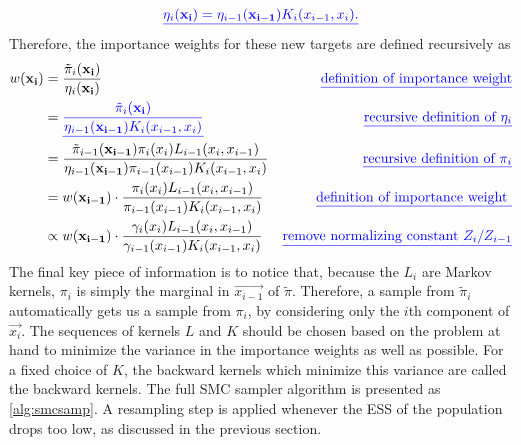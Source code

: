 \[
  \color{blue}\underline{\eta_i(\mathbf{x_i}) = \eta_{i-1}(\mathbf{x_{i-1}})K_i(x_{i-1}, x_i).} \color{black}
\]
Therefore, the importance weights for these new targets are defined recursively as
\begin{align}
  w(\mathbf{x_i}) 
    &= \frac{\tilde{\pi}_i(\mathbf{x_i})}{\eta_i(\mathbf{x_i})} 
      & \color{blue}\underline{\text{definition of importance weight}} \color{black} \nonumber \\
    &= \color{blue}\underline{\frac{\tilde{\pi}_i(\mathbf{x_i})}{\eta_{i-1}(\mathbf{x_{i-1}})K_i(x_{i-1}, x_i)}} \color{black}
      & \color{blue}\underline{\text{recursive definition of } \eta_i} \color{black} \nonumber \\
    &= \frac{\tilde{\pi}_{i-1}(\mathbf{x_{i-1}}) \pi_i(x_i) L_{i-1}(x_i, x_{i-1})}
            {\eta_{i-1}(\mathbf{x_{i-1}}) \pi_{i-1}(x_{i-1}) K_i(x_{i-1}, x_i)}
      & \color{blue}\underline{\text{recursive definition of } \pi_i} \color{black} \nonumber \\
    &= w(\mathbf{x_{i-1}}) \cdot
      \frac{\pi_i(x_i) L_{i-1}(x_i, x_{i-1})}
           {\pi_{i-1}(x_{i-1}) K_i(x_{i-1}, x_i)} 
      & \color{blue}\underline{\text{definition of importance weight }} \color{black} \nonumber \\
    &\propto w(\mathbf{x_{i-1}}) \cdot
      \frac{\gamma_i(x_i) L_{i-1}(x_i, x_{i-1})}
           {\gamma_{i-1}(x_{i-1}) K_i(x_{i-1}, x_i)}
      & \color{blue}\underline{\text{remove normalizing constant $Z_i/Z_{i-1}$}} \color{black} 
    \label{eq:smcwt}
\end{align}
The final key piece of information is to notice that, because the $L_i$ are
Markov kernels, $\pi_i$ is simply the marginal in $\vec{x_{i-1}}$ of
$\tilde{\pi}$. Therefore, a sample from $\tilde{\pi}_i$ automatically gets us a
sample from $\pi_i$, by considering only the $i$th component of $\vec{x_i}$.
 The sequences
of kernels $L$ and $K$ should be chosen based on the problem at hand to
minimize the variance in the importance weights as well as possible. For a
fixed choice of $K$, the backward kernels which minimize this variance are
called the  backward kernels. The full \gls{SMC} sampler
algorithm is presented as \cref{alg:smcsamp}. A resampling step is applied
whenever the \gls{ESS} of the population drops too low, as discussed in the
previous section.

